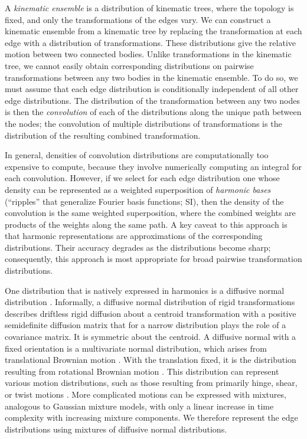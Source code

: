\documentclass[../main.tex]{subfiles}
\begin{document}
\begin{refsection}
A \emph{kinematic ensemble} is a distribution of kinematic trees, where the topology is fixed, and only the transformations of the edges vary.
We can construct a kinematic ensemble from a kinematic tree by replacing the transformation at each edge with a distribution of transformations.
These distributions give the relative motion between two connected bodies.
Unlike transformations in the kinematic tree, we cannot easily obtain corresponding distributions on pairwise transformations between any two bodies in the kinematic ensemble.
To do so, we must assume that each edge distribution is conditionally independent of all other edge distributions.
The distribution of the transformation between any two nodes is then the \emph{convolution} of each of the distributions along the unique path between the nodes; the convolution of multiple distributions of transformations is the distribution of the resulting combined transformation.

In general, densities of convolution distributions are computationally too expensive to compute, because they involve numerically computing an integral for each convolution.
However, if we select for each edge distribution one whose density can be represented as a weighted superposition of \emph{harmonic bases} (``ripples'' that generalize Fourier basis functions; SI), then the density of the convolution is the same weighted superposition, where the combined weights are products of the weights along the same path.
A key caveat to this approach is that harmonic representations are approximations of the corresponding distributions.
Their accuracy degrades as the distributions become sharp; consequently, this approach is most appropriate for broad pairwise transformation distributions.

One distribution that is natively expressed in harmonics is a diffusive normal distribution \cite{chirikjian_harmonic_2016}.
Informally, a diffusive normal distribution of rigid transformations describes driftless rigid diffusion about a centroid transformation with a positive semidefinite diffusion matrix that for a narrow distribution plays the role of a covariance matrix.
It is symmetric about the centroid.
A diffusive normal with a fixed orientation is a multivariate normal distribution, which arises from translational Brownian motion \cite{REF}.
With the translation fixed, it is the distribution resulting from rotational Brownian motion \cite{chirikjian_harmonic_2016}.
This distribution can represent various motion distributions, such as those resulting from primarily hinge, shear, or twist motions .
More complicated motions can be expressed with mixtures, analogous to Gaussian mixture models, with only a linear increase in time complexity with increasing mixture components.
We therefore represent the edge distributions using mixtures of diffusive normal distributions.


\end{refsection}
\end{document}
